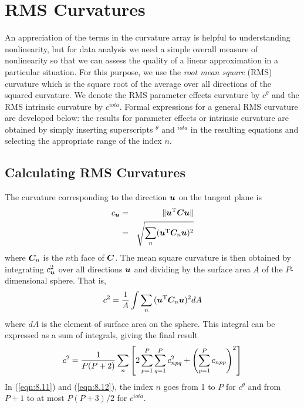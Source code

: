 \section{RMS Curvatures}

An appreciation of the terms in the curvature array is helpful to
understanding nonlinearity, but for data analysis we need a
simple overall measure of nonlinearity so that we can assess
the quality of a linear approximation in a particular situation.
For this purpose, we use the {\em root mean square\/} 
(RMS) curvature which is the square
root of the average over all directions of the squared curvature.
We denote the RMS parameter effects curvature by $c^{\theta}$
and the RMS intrinsic curvature by $c^{iota}$.
Formal expressions for a general RMS curvature are developed
below:  the results for parameter effects or intrinsic curvature
are obtained by simply inserting superscripts $^{\theta}$ and
$^{iota}$ in the resulting equations and selecting the
appropriate range of the index $n$.

\subsection{Calculating RMS Curvatures}

The curvature corresponding to the
direction ${\boldsymbol u}$ on the tangent plane is
\begin{eqnarray*}
  c_{\bu}&=&\norm \bu \trans \bC \bu \norm\\
  &=&\sqrt { \sum_n^{}  ( \bu \trans \bC_n \bu )^2 }  
\end{eqnarray*}
where ${\boldsymbol C}_{n}$ is the $n $th face of ${\boldsymbol C}$.
The mean square curvature is then obtained by integrating
$c_{{\boldsymbol u}}^{2}$ over all directions ${\boldsymbol u}$ and dividing by the surface
area $A$ of the $P$-dimensional sphere.
That is,
\begin{equation}
  c^2 = { 1 \over A } \int { \sum_n { ( \bu \trans \bC_n \bu )^2
  } d A }
  \label{eqn:8.11}
\end{equation}
where $dA$ is the element of surface area on the sphere.
This integral can be expressed as a sum of integrals, giving the
final result \cite{bate:watt:1980}
\begin{equation}
  c^2 = { 1 \over P ( P + 2 ) } \sum_n \left[ 2 \sum_{p=1}^P
  \sum_{q=1}^P c_{npq}^2 + \left( \sum_{p=1}^P c_{npp}
  \right)^2\right]
\label{eqn:8.12}
\end{equation}
In (\ref{eqn:8.11}) and (\ref{eqn:8.12}),
the index $n$ goes from 1 to $P$
for $c^{\theta}$ and
from $P + 1$ to at most $P( P + 3 )/2$
for $c^{iota}$.

